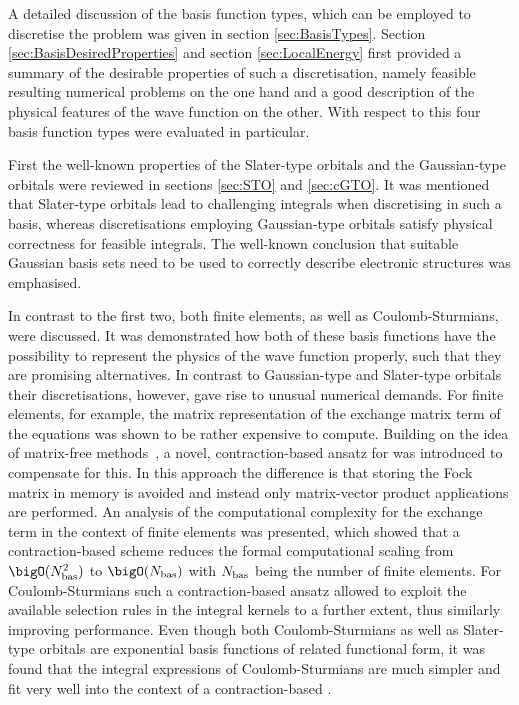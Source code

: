 
A detailed discussion of the basis function types,
which can be employed to discretise the \HF problem
was given in section \ref{sec:BasisTypes}.
Section \ref{sec:BasisDesiredProperties} and section \ref{sec:LocalEnergy}
first provided a summary of the desirable properties of such a discretisation,
namely feasible resulting numerical problems on the one hand
and a good description of the physical features of the wave function
on the other.
With respect to this
four basis function types were evaluated in particular.

First the well-known properties of the Slater-type orbitals
and the Gaussian-type orbitals were reviewed
in sections \ref{sec:STO} and \ref{sec:cGTO}.
It was mentioned that Slater-type orbitals lead to challenging
integrals when discretising \HF in such a basis,
whereas discretisations employing Gaussian-type orbitals
satisfy physical correctness
for feasible integrals.
The well-known conclusion
that suitable Gaussian basis sets need to be used to correctly
describe electronic structures was emphasised.

In contrast to the first two,
both finite elements,
as well as Coulomb-Sturmians,
were discussed.
It was demonstrated how both of these basis functions have the possibility
to represent the physics of the wave function properly,
such that they are promising alternatives.
In contrast to Gaussian-type and Slater-type orbitals
their discretisations, however,
gave rise to unusual numerical demands.
For finite elements, for example,
the matrix representation of the exchange matrix term of the \HF equations
was shown to be rather expensive to compute.
Building on the idea of matrix-free methods~\cite{Kronbichler2012},
a novel, contraction-based ansatz for \HF was introduced
to compensate for this.
In this approach the difference is that storing the Fock matrix in memory
is avoided and instead only matrix-vector product applications are performed.
An analysis of the computational complexity
for the exchange term in the context of finite elements was presented,
which showed that a contraction-based scheme
reduces the formal computational scaling from $\bigO(\Nbas^2)$
to $\bigO(\Nbas)$ with $N_\text{bas}$ being the number of finite elements.
For Coulomb-Sturmians such a contraction-based \SCF ansatz
allowed to exploit the available selection rules in the integral kernels
to a further extent,
thus similarly improving performance.
Even though both Coulomb-Sturmians as well as Slater-type
orbitals are exponential basis functions
of related functional form,
it was found that the integral expressions of Coulomb-Sturmians are much simpler
and fit very well into the context of a contraction-based \SCF.

